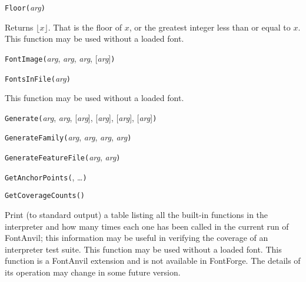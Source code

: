 

\texttt{Floor(}\textit{arg}\texttt{)}

Returns $\lfloor x \rfloor$.  That is the floor of $x$, or the greatest
integer less than or equal to $x$.  This function may be used without a
loaded font.



\texttt{FontImage(}\textit{arg}, \textit{arg}, \textit{arg}, [\textit{arg}]\texttt{)}



\texttt{FontsInFile(}\textit{arg}\texttt{)}

This function may be used without a loaded font.



\texttt{Generate(}\textit{arg}, \textit{arg}, [\textit{arg}], [\textit{arg}], [\textit{arg}], [\textit{arg}]\texttt{)}



\texttt{GenerateFamily(}\textit{arg}, \textit{arg}, \textit{arg}, \textit{arg}\texttt{)}



\texttt{GenerateFeatureFile(}\textit{arg}, \textit{arg}\texttt{)}



\texttt{GetAnchorPoints(}, \ldots\texttt{)}



\texttt{GetCoverageCounts()}

Print (to standard output) a table listing all the built-in functions in the
interpreter and how many times each one has been called in the current run
of FontAnvil; this information may be useful in verifying the coverage of an
interpreter test suite.
This function may be used without a loaded font.  This \FFdiff function is a
FontAnvil extension and is not available in FontForge.  The details of its
operation may change in some future version.

